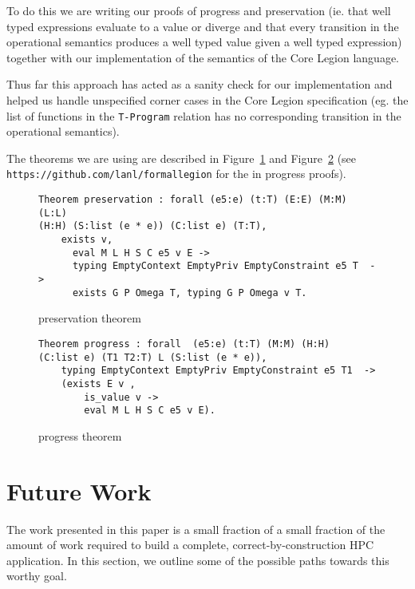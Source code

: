 \documentclass[sigconf]{acmart}
\begin{document}
To do this we are writing our proofs of progress and preservation (ie. that well
typed expressions evaluate to a value or diverge and that
every transition in the operational semantics produces a well typed value given
a well typed expression) together with our implementation of the semantics of
the Core Legion language.

Thus far this approach has acted as a sanity check for our implementation and helped us
handle unspecified corner cases in the Core Legion specification (eg. the list
of functions in the \texttt{T-Program} relation has no corresponding transition in the
operational semantics). 

The theorems we are using are described in Figure~\ref{preservationtheorem} and
Figure~\ref{progresstheorem} (see
\texttt{https://github.com/lanl/formallegion} for the in progress proofs). 

\begin{figure}
\begin{BVerbatim}
Theorem preservation : forall (e5:e) (t:T) (E:E) (M:M) (L:L) 
(H:H) (S:list (e * e)) (C:list e) (T:T),
    exists v,
      eval M L H S C e5 v E ->
      typing EmptyContext EmptyPriv EmptyConstraint e5 T  ->
      exists G P Omega T, typing G P Omega v T.
\end{BVerbatim}
\caption{preservation theorem}
\label{preservationtheorem}
\end{figure}

\begin{figure}
\begin{BVerbatim}
Theorem progress : forall  (e5:e) (t:T) (M:M) (H:H)  
(C:list e) (T1 T2:T) L (S:list (e * e)),
    typing EmptyContext EmptyPriv EmptyConstraint e5 T1  ->
    (exists E v ,
        is_value v ->
        eval M L H S C e5 v E).
\end{BVerbatim}
\caption{progress theorem}
\label{progresstheorem}
\end{figure}


\section{Future Work}

The work presented in this paper is a small fraction of a small fraction of the
amount of work required to build a complete, correct-by-construction HPC
application. In this section, we outline some of the possible paths towards
this worthy goal. 
\end{document}
